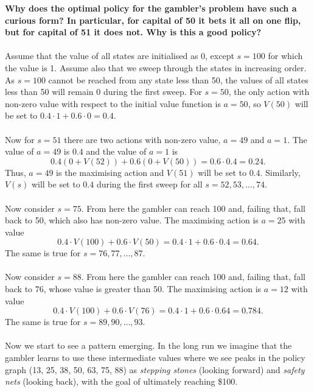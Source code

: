 \documentclass[a4paper,11pt]{article}
\numberwithin{equation}{section}
\theoremstyle{remark}
\begin{document}
\textbf{Why does the optimal policy for the gambler’s problem have such a curious form? In particular, for capital of 50 it bets it all on one flip, but for capital of 51 it does not. Why is this a good policy?}
\\ \\
Assume that the value of all states are initialised as 0, except $s=100$ for which the value is 1. Assume also that we sweep through the states in increasing order. As $s=100$ cannot be reached from any state less than 50, the values of all states less than 50 will remain 0 during the first sweep. For $s=50$, the only action with non-zero value with respect to the initial value function is $a=50$, so $V(50)$ will be set to $0.4 \cdot 1 + 0.6 \cdot 0 = 0.4$.
\\ \\
Now for $s=51$ there are two actions with non-zero value, $a=49$ and $a=1$. The value of $a=49$ is $0.4$ and the value of $a=1$ is 
\[
	0.4 (0 + V(52)) + 0.6 (0 + V(50)) = 0.6 \cdot 0.4 = 0.24.
\]
Thus, $a=49$ is the maximising action and $V(51)$ will be set to $0.4$. Similarly, $V(s)$ will be set to $0.4$ during the first sweep for all $s=52, 53, \dots, 74$.
\\ \\
Now consider $s=75$. From here the gambler can reach 100 and, failing that, fall back to 50, which also has non-zero value. The maximising action is $a=25$ with value 
\[
	0.4 \cdot  V(100) + 0.6 \cdot  V(50) = 0.4 \cdot 1 + 0.6 \cdot 0.4 = 0.64.
\]
The same is true for $s=76, 77, \dots, 87$.
\\ \\
Now consider $s=88$. From here the gambler can reach 100 and, failing that, fall back to 76, whose value is greater than 50. The maximising action is $a=12$ with value 
\[
0.4 \cdot  V(100) + 0.6 \cdot  V(76) = 0.4 \cdot 1 + 0.6 \cdot 0.64 = 0.784.
\]
The same is true for $s=89, 90, \dots, 93$.
\\ \\
Now we start to see a pattern emerging. In the long run we imagine that the gambler learns to use these intermediate values where we see peaks in the policy graph (13, 25, 38, 50, 63, 75, 88) as \emph{stepping stones} (looking forward) and \emph{safety nets} (looking back), with the goal of ultimately reaching \$100. 




%
%
%
\end{document}
